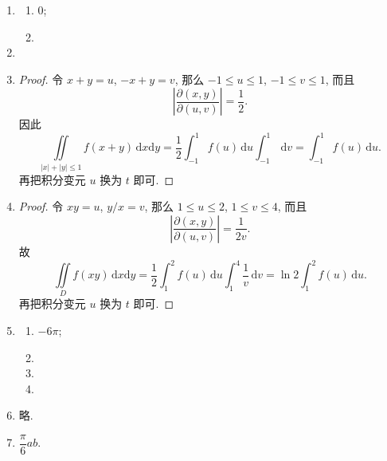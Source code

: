 \documentclass[a4paper, 11pt]{ctexart}
\begin{document}
\begin{enumerate}
    \item %
        \begin{multicols}{2}
            \begin{enumerate}[(1)]
                \item %
                    $0$;
                \item %
            \end{enumerate}
        \end{multicols}
    \item %
    \item %
        \begin{proof}
            令 $x+y=u$, $-x+y=v$, 那么 $-1 \leq u \leq 1$, $-1 \leq v \leq 1$, 而且
            \[
                \left|\frac{\partial(x,y)}{\partial(u,v)}\right| = \frac12.    
            \]
            因此
            \[
                \iint\limits_{|x|+|y|\leq1}f(x+y)\,\mathrm{d}x\mathrm{d}y = \frac12\int_{-1}^{1}f(u)\,\mathrm{d}u\int_{-1}^1\,\mathrm{d}v = \int_{-1}^{1}f(u)\,\mathrm{d}u.   
            \]
            再把积分变元 $u$ 换为 $t$ 即可.
        \end{proof}
    \item %
        \begin{proof}
            令 $xy=u$, $y/x=v$, 那么 $1\leq u\leq 2$, $1 \leq v \leq 4$, 而且
            \[
                \left|\frac{\partial(x,y)}{\partial(u,v)}\right| = \frac{1}{2v}.    
            \]
            故
            \[
                \iint\limits_{D}f(xy)\,\mathrm{d}x\mathrm{d}y = \frac12\int_1^2f(u)\,\mathrm{d}u\int_1^4\frac1v\,\mathrm{d}v = \ln2\int_1^2f(u)\,\mathrm{d}u.    
            \]
            再把积分变元 $u$ 换为 $t$ 即可.
        \end{proof}
    \item %
        \begin{multicols}{2}
            \begin{enumerate}[(1)]
                \item %
                    $-6\pi$;
                \item %
                \item %
                \item %
            \end{enumerate}
        \end{multicols}
    \item %
        略.
    \item %
        $\dfrac{\pi}{6}ab$.
\end{enumerate}
\end{document}
